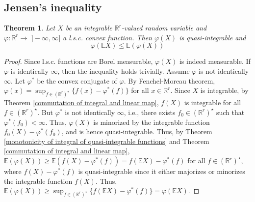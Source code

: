 \documentclass[11pt, a4paper, openany]{book}
\newtheorem{thm}{Theorem}\newtheorem{lem}{Lemma}\newtheorem{crl}{Corollary}
\theoremstyle{definition}
\begin{document}
\subsection{Jensen's inequality}
    \begin{thm}\label{Jensen's inequality, general form}
        Let $X$ be an integrable $\mathbb{R}^r$-valued random variable and $\varphi:\mathbb{R}^r\rightarrow \,\,]\!-\!\infty,\infty]$ a l.s.c. convex function. Then $\varphi(X)$ is quasi-integrable and
        \[
            \varphi(\mathbb{E}X)\leqslant \mathbb{E}(\varphi(X))
        \]
    \end{thm}
    \begin{proof}
        Since l.s.c. functions are Borel measurable, $\varphi(X)$ is indeed measurable. If $\varphi$ is identically $\infty$, then the inequality holds trivially. Assume $\varphi$ is not identically $\infty$. Let $\varphi^*$ be the convex conjugate of $\varphi$. By Fenchel-Moreau theorem, $\varphi(x)=\sup_{f\in(\mathbb{R}^r)^\star}{\{f(x)-\varphi^*(f)\}}$ for all $x\in \mathbb{R}^r$. Since $X$ is integrable, by Theorem \ref{commutation of integral and linear map}, $f(X)$ is integrable for all $f\in(\mathbb{R}^r)^\star$. But $\varphi^*$ is not identically $\infty$, i.e., there exists $f_0\in (\mathbb{R}^r)^\star$ such that $\varphi^*(f_0)<\infty$. Thus, $\varphi(X)$ is minorized by the integrable function $f_0(X)-\varphi^*(f_0)$, and is hence quasi-integrable. Thus, by Theorem \ref{monotonicity of integral of quasi-integrable functions} and Theorem \ref{commutation of integral and linear map}, $\mathbb{E}(\varphi(X))\geqslant \mathbb{E}(f(X)-\varphi^*(f))=f(\mathbb{E}X)-\varphi^*(f)$ for all $f\in (\mathbb{R}^r)^\star$, where $f(X)-\varphi^*(f)$ is quasi-integrable since it either majorizes or minorizes the integrable function $f(X)$. Thus, $\mathbb{E}(\varphi(X))\geqslant \sup_{f\in (\mathbb{R}^r)^\star}{\{f(\mathbb{E}X)-\varphi^*(f)\}}=\varphi(\mathbb{E}X)$.
    \end{proof}
\end{document}
